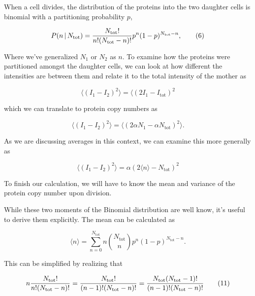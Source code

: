 When a cell divides, the distribution of the proteins into the two daughter cells is binomial with a partitioning probability $p$,

\begin{equation}
P(n \, \vert \, N_\text{tot}) = {N_\text{tot}! \over n! (N_\text{tot} - n)!} p^{n}(1 - p)^{N_\text{tot} - n}, \tag{6}
\end{equation}

Where we've generalized $N_1$ or $N_2$ as $n$. To examine how the proteins were partitioned amongst the daughter cells, we can look at how different the intensities are between them and relate it to the total intensity of the mother as

\begin{equation}
\langle(I_1 - I_2)^2\rangle = \langle (2I_1 - I_\text{tot})^2 \tag{7}
\end{equation}

which we can translate to protein copy numbers as

\begin{equation}
\langle(I_1 - I_2)^2\rangle = \langle\left(2\alpha N_1 - \alpha N_\text{tot}\right)^2\rangle. \tag{8}
\end{equation}

As we are discussing averages in this context, we can examine this more generally as

\begin{equation}
\langle(I_1 - I_2)^2 \rangle = \alpha(2\langle n \rangle - N_\text{tot})^2 \tag{9}
\end{equation}

To finish our calculation, we will have to know the mean and variance of the protein copy number upon division.

While these two moments of the Binomial distribution are well know, it's useful to derive them explicitly. The mean can be calculated as

\begin{equation}
\langle n \rangle = \sum\limits_{n = 0}^{N_\text{tot}}n{{N_\text{tot}}\choose{n}}p^{n}(1-p)^{N_\text{tot} - n}. \tag{10}
\end{equation}

This can be simplified by realizing that

\begin{equation}
n {N_\text{tot}! \over n!(N_\text{tot} - n)!} = {N_\text{tot}! \over (n-1)!(N_\text{tot} - n)!} = {N_\text{tot}(N_\text{tot} - 1)! \over (n - 1)!(N_\text{tot} - n)!} \tag{11}
\end{equation}

